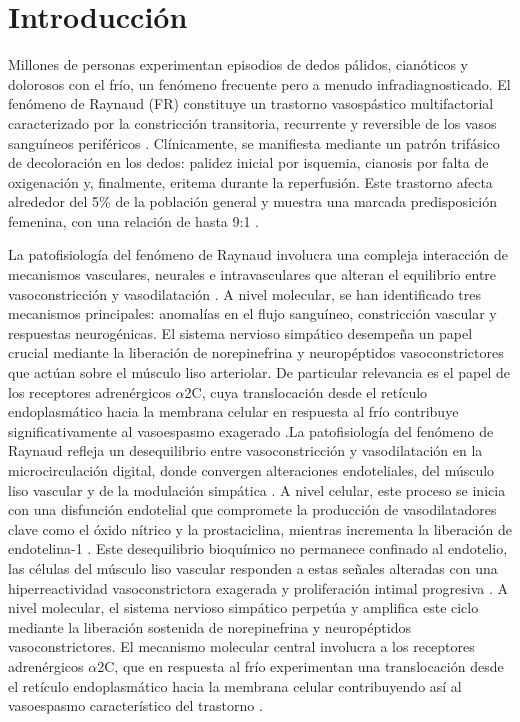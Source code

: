 \section{Introducción}

Millones de personas experimentan episodios de dedos pálidos, cianóticos y dolorosos con el frío, un fenómeno frecuente pero a menudo infradiagnosticado. El fenómeno de Raynaud (FR) constituye un trastorno vasospástico multifactorial caracterizado por la constricción transitoria, recurrente y reversible de los vasos sanguíneos periféricos \cite{Nawaz2022}.  Clínicamente, se manifiesta mediante un patrón trifásico de decoloración en los dedos: palidez inicial por isquemia, cianosis por falta de oxigenación y, finalmente, eritema durante la reperfusión. Este trastorno afecta alrededor del 5\% de la población general y muestra una marcada predisposición femenina, con una relación de hasta 9:1 \cite{Medscape2024, Musa2023}.  

La patofisiología del fenómeno de Raynaud involucra una compleja interacción de mecanismos vasculares, neurales e intravasculares que alteran el equilibrio entre vasoconstricción y vasodilatación \cite{Herrick2005}. A nivel molecular, se han identificado tres mecanismos principales: anomalías en el flujo sanguíneo, constricción vascular y respuestas neurogénicas. El sistema nervioso simpático desempeña un papel crucial mediante la liberación de norepinefrina y neuropéptidos vasoconstrictores que actúan sobre el músculo liso arteriolar. De particular relevancia es el papel de los receptores adrenérgicos $\alpha$2C, cuya translocación desde el retículo endoplasmático hacia la membrana celular en respuesta al frío contribuye significativamente al vasoespasmo exagerado \cite{Fardoun2016, Flavahan2008}.La patofisiología del fenómeno de Raynaud refleja un desequilibrio entre vasoconstricción y vasodilatación en la microcirculación digital, donde convergen alteraciones endoteliales, del músculo liso vascular y de la modulación simpática \cite{Herrick2005}. A nivel celular, este proceso se inicia con una disfunción endotelial que compromete la producción de vasodilatadores clave como el óxido nítrico y la prostaciclina, mientras incrementa la liberación de endotelina-1 \cite{Flavahan2008, Blann1993}. Este desequilibrio bioquímico no permanece confinado al endotelio, las células del músculo liso vascular responden a estas señales alteradas con una hiperreactividad vasoconstrictora exagerada y proliferación intimal progresiva \cite{Fardoun2016}. A nivel molecular, el sistema nervioso simpático perpetúa y amplifica este ciclo mediante la liberación sostenida de norepinefrina y neuropéptidos vasoconstrictores. El mecanismo molecular central involucra a los receptores adrenérgicos $\alpha$2C, que en respuesta al frío experimentan una translocación desde el retículo endoplasmático hacia la membrana celular contribuyendo así al vasoespasmo característico del trastorno \cite{Fardoun2016, Flavahan2008}.

